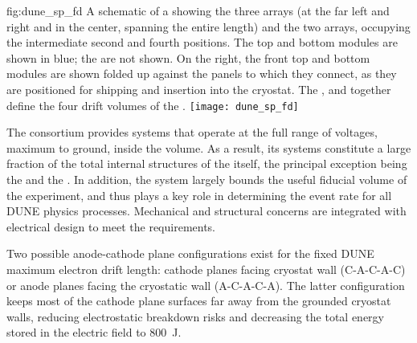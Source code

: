 \begin{dunefigure}{fig:dune_sp_fd}
{%
A schematic of a  showing the three  arrays (at the far left and right and in the center, spanning the entire  length) and the two  arrays, occupying the intermediate second and fourth positions. The top and bottom  modules are shown in blue; the  are not shown. 
On the right, the front top and bottom  modules are shown folded up against the  panels to which they connect, as they are positioned for shipping and insertion into the cryostat.  The ,  and  together define the four drift volumes of the .}
\texttt{[image: dune\_sp\_fd]}
\end{dunefigure}

The  consortium provides systems that operate at the full range of voltages, %
maximum to ground, inside the  volume. As a result, its systems constitute a large fraction of the total internal structures of the  itself, the principal exception being the  and the . In addition, the  system largely bounds the useful fiducial volume of the experiment, and thus plays a key role in determining the event rate for all DUNE physics processes. Mechanical and structural concerns are integrated with electrical design to meet the requirements. 


Two possible anode-cathode plane configurations exist for the fixed DUNE maximum electron drift length: cathode planes facing cryostat wall (C-A-C-A-C) or anode planes facing the cryostatic wall (A-C-A-C-A).  The latter configuration keeps most of the cathode plane surfaces far away from the grounded cryostat walls, reducing electrostatic breakdown risks and decreasing the total energy stored in the electric field to \SI{800}{J}.

